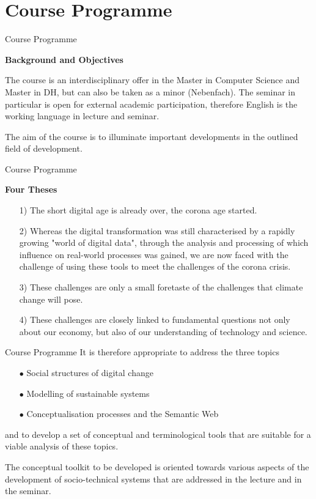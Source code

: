 \documentclass{beamer}
\newcommand{\ueberschrift}[1]{\begin{center}\bf #1\end{center}}
\begin{document}
\section{Course Programme}
\begin{frame}{Course Programme}

\ueberschrift{Background and Objectives}

The course is an interdisciplinary offer in the Master in Computer Science and
Master in DH, but can also be taken as a minor (Nebenfach).  The seminar in
particular is open for external academic participation, therefore English is
the working language in lecture and seminar.

The aim of the course is to illuminate important developments in the outlined
field of development.  
\end{frame}

\begin{frame}{Course Programme}
\ueberschrift{Four Theses}
\begin{itemize}
\item[1)] The short digital age is already over, the corona age started.
\item[2)] Whereas the digital transformation was still characterised by a
  rapidly growing "world of digital data", through the analysis and processing
  of which influence on real-world processes was gained, we are now faced with
  the challenge of using these tools to meet the challenges of the corona
  crisis.
\item[3)] These challenges are only a small foretaste of the challenges that
  climate change will pose.
\item[4)] These challenges are closely linked to fundamental questions not
  only about our economy, but also of our understanding of technology and
  science.
\end{itemize}
\end{frame}

\begin{frame}{Course Programme}
It is therefore appropriate to address the three topics

\begin{itemize}
\item[$\bullet$] Social structures of digital change
\item[$\bullet$] Modelling of sustainable systems
\item[$\bullet$] Conceptualisation processes and the Semantic Web
\end{itemize}
and to develop a set of conceptual and terminological tools that are suitable
for a viable analysis of these topics.

The conceptual toolkit to be developed is oriented towards various aspects of
the development of socio-technical systems that are addressed in the lecture
and in the seminar.
\end{frame}
\end{document}

